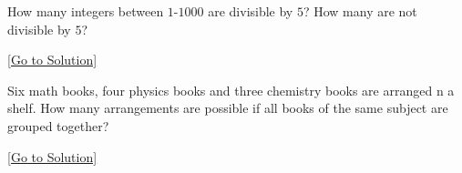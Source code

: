 \begin{exercise}\label{ex:2.24.11}
    How many integers between $1$-$1000$ are divisible by $5$? How many are not divisible by $5$? 
\end{exercise}\hyperref[sol:2.24.11]{[Go to Solution]}

\begin{exercise}\label{ex:2.24.12}
    Six math books, four physics books and three chemistry books are arranged n a shelf. How many arrangements are possible if all books of the same subject are grouped together? 
\end{exercise}\hyperref[sol:2.24.12]{[Go to Solution]}
